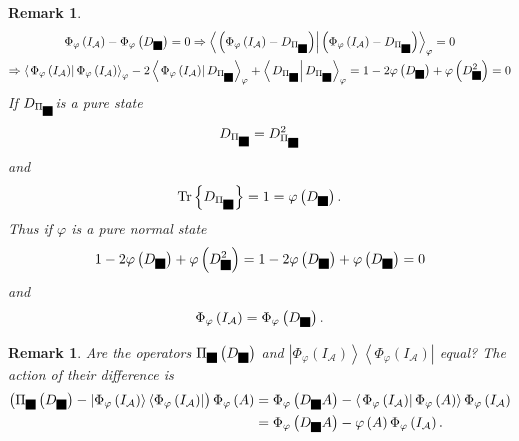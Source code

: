 \documentclass[aps,preprint]{revtex4}%
\providecommand{\U}[1]{\protect\rule{.1in}{.1in}}
\newtheorem{remark}[theorem]{Remark}
\begin{document}
\begin{remark}%
\begin{gather}
\Phi_{\varphi}\left(  I_{\mathcal{A}}\right)  -\Phi_{\varphi}\left(
D_{\U{3c6} }\right)  =0\Rightarrow\left\langle \left.  \left(  \Phi_{\varphi
}\left(  I_{\mathcal{A}}\right)  -D_{\Pi_{\U{3c6} }}\right)  \right\vert
\left(  \Phi_{\varphi}\left(  I_{\mathcal{A}}\right)  -D_{\Pi_{\U{3c6} }%
}\right)  \right\rangle _{\varphi}=0\\
\Rightarrow\left\langle \left.  \Phi_{\varphi}\left(  I_{\mathcal{A}}\right)
\right\vert \Phi_{\varphi}\left(  I_{\mathcal{A}}\right)  \right\rangle
_{\varphi}-2\left\langle \left.  \Phi_{\varphi}\left(  I_{\mathcal{A}}\right)
\right\vert D_{\Pi_{\U{3c6} }}\right\rangle _{\varphi}+\left\langle \left.
D_{\Pi_{\U{3c6} }}\right\vert D_{\Pi_{\U{3c6} }}\right\rangle _{\varphi
}=1-2\varphi\left(  D_{\U{3c6} }\right)  +\varphi\left(  D_{\U{3c6} }%
^{2}\right)  =0
\end{gather}
If $D_{\Pi_{\U{3c6} }}$is a pure state
\begin{equation}
D_{\Pi_{\U{3c6} }}=D_{\Pi_{\U{3c6} }}^{2}%
\end{equation}
and
\begin{equation}
\operatorname{Tr}\left\{  D_{\Pi_{\U{3c6} }}\right\}  =1=\varphi\left(
D_{\U{3c6} }\right)  .
\end{equation}
Thus if $\varphi$ is a pure normal state
\begin{equation}
1-2\varphi\left(  D_{\U{3c6} }\right)  +\varphi\left(  D_{\U{3c6} }%
^{2}\right)  =1-2\varphi\left(  D_{\U{3c6} }\right)  +\varphi\left(
D_{\U{3c6} }\right)  =0
\end{equation}
and
\begin{equation}
\Phi_{\varphi}\left(  I_{\mathcal{A}}\right)  =\Phi_{\varphi}\left(
D_{\U{3c6} }\right)  .
\end{equation}

\end{remark}

\begin{remark}
Are the operators $\Pi_{\U{3c6} }\left(  D_{\U{3c6} }\right)  $ and
$\left\vert \Phi_{\varphi}\left(  I_{\mathcal{A}}\right)  \right\rangle
\left\langle \Phi_{\varphi}\left(  I_{\mathcal{A}}\right)  \right\vert $
equal? The action of their difference is
\begin{align}
\left(  \Pi_{\U{3c6} }\left(  D_{\U{3c6} }\right)  -\left\vert \Phi_{\varphi
}\left(  I_{\mathcal{A}}\right)  \right\rangle \left\langle \Phi_{\varphi
}\left(  I_{\mathcal{A}}\right)  \right\vert \right)  \Phi_{\varphi}\left(
A\right)   &  =\Phi_{\varphi}\left(  D_{\U{3c6} }A\right)  -\left\langle
\left.  \Phi_{\varphi}\left(  I_{\mathcal{A}}\right)  \right\vert
\Phi_{\varphi}\left(  A\right)  \right\rangle \Phi_{\varphi}\left(
I_{\mathcal{A}}\right) \\
&  =\Phi_{\varphi}\left(  D_{\U{3c6} }A\right)  -\varphi\left(  A\right)
\Phi_{\varphi}\left(  I_{\mathcal{A}}\right)  .
\end{align}

\end{remark}
\end{document}
